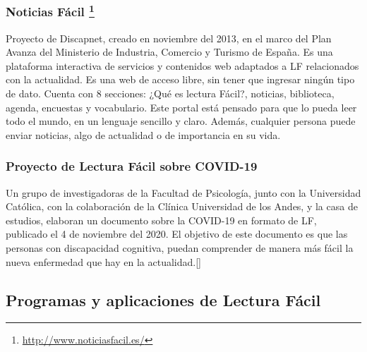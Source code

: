 \subsubsection{{Noticias Fácil} \footnote{\href{http://www.noticiasfacil.es/}{http://www.noticiasfacil.es/}}}
Proyecto de Discapnet, creado en noviembre del 2013, en el marco del Plan Avanza del Ministerio de Industria, Comercio y Turismo de España. Es una plataforma interactiva de servicios y contenidos web adaptados a LF relacionados con la actualidad. Es una web de acceso libre, sin tener que ingresar ningún tipo de dato. Cuenta con 8 secciones: ¿Qué es lectura Fácil?, noticias, biblioteca, agenda, encuestas y vocabulario. Este portal está pensado para que lo pueda leer todo el mundo, en un lenguaje sencillo y claro. Además, cualquier persona puede enviar noticias, algo de actualidad o de importancia en su vida.

\subsubsection{Proyecto de Lectura Fácil sobre COVID-19}

Un grupo de investigadoras de la Facultad de Psicología, junto con la Universidad Católica, con la colaboración de la Clínica Universidad de los Andes, y la casa de estudios, elaboran un documento sobre la COVID-19 en formato de LF, publicado el 4 de noviembre del 2020.
El objetivo de este documento es que las personas con discapacidad cognitiva, puedan comprender de manera más fácil la nueva enfermedad que hay en la actualidad.[\cite{covid}]


\subsection{Programas y aplicaciones de Lectura Fácil}



